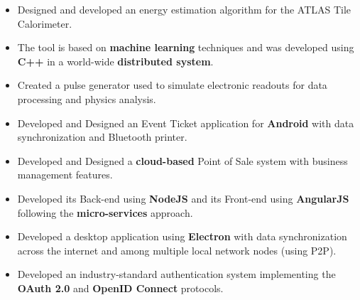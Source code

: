\documentclass[10pt,a4paper,ragged2e]{altacv}
\begin{document}
\divider%



\begin{itemize}
	\item Designed and developed an energy estimation algorithm for the ATLAS Tile Calorimeter.
	\item The tool is based on \textbf{machine learning} techniques and was developed using \textbf{C++} in a world-wide \textbf{distributed system}.
	\item Created a pulse generator used to simulate electronic readouts for data processing and physics analysis.
\end{itemize}

\divider%

\begin{itemize}
\item Developed and Designed an Event Ticket application for \textbf{Android} with data synchronization and Bluetooth printer.
\item Developed and Designed a \textbf{cloud-based} Point of Sale system with business management features.
\item Developed its Back-end using \textbf{NodeJS} and its Front-end using \textbf{AngularJS} following the \textbf{micro-services} approach.
\item Developed a desktop application using \textbf{Electron} with data synchronization across the internet and among multiple local network nodes (using P2P).
\item Developed an industry-standard authentication system implementing the \textbf{OAuth 2.0} and \textbf{OpenID Connect} protocols.
\end{itemize}

\divider%
\end{document}
